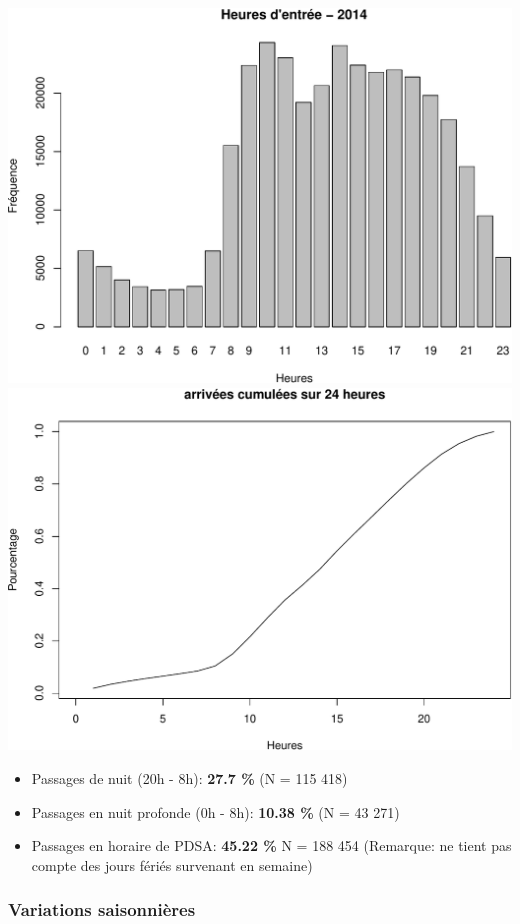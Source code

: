 \documentclass[]{article}
\begin{document}
\includegraphics{rapport2014_V4_files/figure-latex/horaires-1.pdf}
\includegraphics{rapport2014_V4_files/figure-latex/horaires-2.pdf}

\begin{itemize}
\item
  Passages de nuit (20h - 8h): \textbf{27.7 \%} (N = 115 418)
\item
  Passages en nuit profonde (0h - 8h): \textbf{10.38 \%} (N = 43 271)
\item
  Passages en horaire de PDSA: \textbf{45.22 \%} N = 188 454 (Remarque:
  ne tient pas compte des jours fériés survenant en semaine)
\end{itemize}

\subsubsection{Variations saisonnières}\label{variations-saisonnieres}
\end{document}
